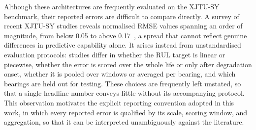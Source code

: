 Although these architectures are frequently evaluated on the XJTU-SY
benchmark, their reported errors are difficult to compare directly. A
survey of recent XJTU-SY studies reveals normalised RMSE values
spanning an order of magnitude, from below 0.05 to above
0.17~\cite{QIAO2026112248, YONGXING2026104313}, a spread that cannot
reflect genuine differences in predictive capability alone. It arises
instead from unstandardised evaluation protocols: studies differ in
whether the RUL target is linear or piecewise, whether the error is
scored over the whole life or only after degradation onset, whether it
is pooled over windows or averaged per bearing, and which bearings are
held out for testing. These choices are frequently left unstated, so
that a single headline number conveys little without its accompanying
protocol. This observation motivates the explicit reporting convention
adopted in this work, in which every reported error is qualified by its
scale, scoring window, and aggregation, so that it can be interpreted
unambiguously against the literature.\\

